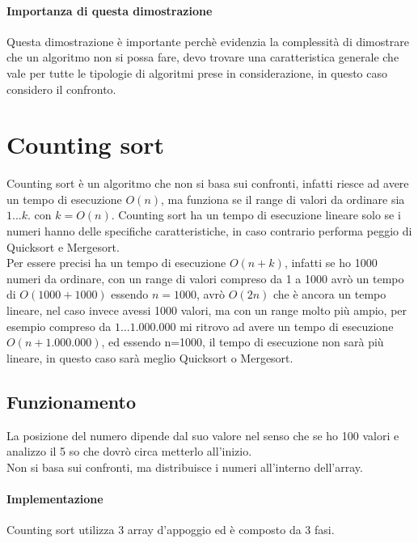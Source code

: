 \paragraph*{Importanza di questa dimostrazione} Questa dimostrazione è importante perchè
evidenzia la complessità di dimostrare che un algoritmo non si possa fare, devo trovare 
una caratteristica generale che vale per tutte le tipologie di algoritmi prese in
considerazione, in questo caso considero il confronto.

\section*{Counting sort}
Counting sort è un algoritmo che non si basa sui confronti, infatti riesce ad avere un
tempo di esecuzione $O(n)$, ma funziona se il range di valori da ordinare sia $1...k$.
con $k=O(n)$. Counting sort ha un tempo di esecuzione lineare solo se i numeri hanno delle
specifiche caratteristiche, in caso contrario performa peggio di Quicksort e Mergesort.\\
Per essere precisi ha un tempo di esecuzione $O(n+k)$, infatti se ho 1000 numeri da ordinare,
con un range di valori compreso da 1 a 1000 avrò un tempo di $O(1000 + 1000)$ essendo $n=1000$,
avrò $O(2n)$ che è ancora un tempo lineare, nel caso invece avessi 1000 valori, ma con un range molto
più ampio, per esempio compreso da $1\dots 1.000.000$ mi ritrovo ad avere un tempo di esecuzione $O(n+1.000.000)$,
ed essendo n=1000, il tempo di esecuzione non sarà più lineare, in questo caso sarà meglio Quicksort o Mergesort.\\
\subsection{Funzionamento}
La posizione del numero dipende dal suo valore nel senso che se ho 100 valori e analizzo il 5 so che dovrò
circa metterlo all'inizio.\\
Non si basa sui confronti, ma distribuisce i numeri all'interno dell'array.\\
\paragraph*{Implementazione}
Counting sort utilizza 3 array d'appoggio ed è composto da 3 fasi.\\
